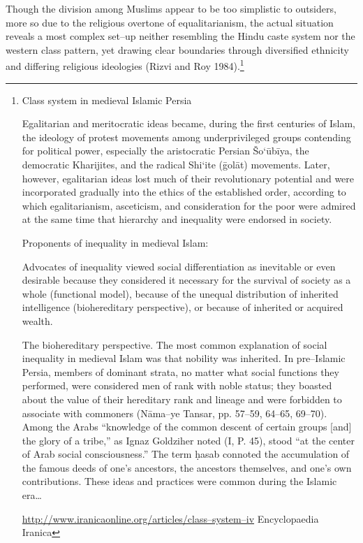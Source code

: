 \begin{myquote}
Though the division among Muslims appear to be too simplistic to outsiders, more so due to the religious overtone of equalitarianism, the actual situation reveals a most complex set–up neither resembling the Hindu caste system nor the western class pattern, yet drawing clear boundaries through diversified ethnicity and differing religious ideologies (Rizvi and Roy 1984).\footnote{Class system in medieval Islamic Persia

Egalitarian and meritocratic ideas became, during the first centuries of Islam, the ideology of protest movements among underprivileged groups contending for political power, especially the aristocratic Persian Šo`ūbīya, the democratic Kharijites, and the radical Shi`ite (ḡolāt) movements. Later, however, egalitarian ideas lost much of their revolutionary potential and were incorporated gradually into the ethics of the established order, according to which egalitarianism, asceticism, and consideration for the poor were admired at the same time that hierarchy and inequality were endorsed in society.

Proponents of inequality in medieval Islam:

Advocates of inequality viewed social differentiation as inevitable or even desirable because they considered it necessary for the survival of society as a whole (functional model), because of the unequal distribution of inherited intelligence (biohereditary perspective), or because of inherited or acquired wealth.

The biohereditary perspective. The most common explanation of social inequality in medieval Islam was that nobility was inherited. In pre–Islamic Persia, members of dominant strata, no matter what social functions they performed, were considered men of rank with noble status; they boasted about the value of their hereditary rank and lineage and were forbidden to associate with commoners (Nāma–ye Tansar, pp. 57–59, 64–65, 69–70). Among the Arabs “knowledge of the common descent of certain groups [and] the glory of a tribe,” as Ignaz Goldziher noted (I, P. 45), stood “at the center of Arab social consciousness.” The term ḥasab connoted the accumulation of the famous deeds of one’s ancestors, the ancestors themselves, and one’s own contributions. These ideas and practices were common during the Islamic era…

\url{http://www.iranicaonline.org/articles/class–system–iv} Encyclopaedia Iranica}
\end{myquote}

